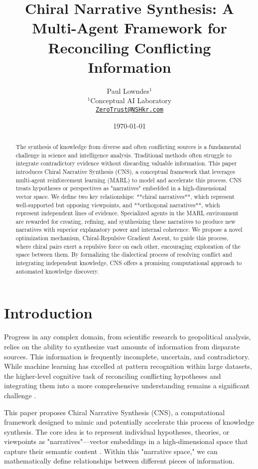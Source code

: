 \documentclass[12pt, a4paper]{article}
\title{\textbf{Chiral Narrative Synthesis: A Multi-Agent Framework for Reconciling Conflicting Information}}
\author{
    Paul Lowndes$^{1}$ \\
    \small $^{1}$Conceptual AI Laboratory \\
    \small \href{mailto:ZeroTrust@NSHkr.com}{\texttt{ZeroTrust@NSHkr.com}}
}
\date{\today}
\begin{document}
\maketitle
\vspace{-2em}

\begin{abstract}
The synthesis of knowledge from diverse and often conflicting sources is a fundamental challenge in science and intelligence analysis. Traditional methods often struggle to integrate contradictory evidence without discarding valuable information. This paper introduces Chiral Narrative Synthesis (CNS), a conceptual framework that leverages multi-agent reinforcement learning (MARL) to model and accelerate this process. CNS treats hypotheses or perspectives as "narratives" embedded in a high-dimensional vector space. We define two key relationships: **chiral narratives**, which represent well-supported but opposing viewpoints, and **orthogonal narratives**, which represent independent lines of evidence. Specialized agents in the MARL environment are rewarded for creating, refining, and synthesizing these narratives to produce new narratives with superior explanatory power and internal coherence. We propose a novel optimization mechanism, Chiral-Repulsive Gradient Ascent, to guide this process, where chiral pairs exert a repulsive force on each other, encouraging exploration of the space between them. By formalizing the dialectical process of resolving conflict and integrating independent knowledge, CNS offers a promising computational approach to automated knowledge discovery.
\end{abstract}

\section{Introduction}

Progress in any complex domain, from scientific research to geopolitical analysis, relies on the ability to synthesize vast amounts of information from disparate sources. This information is frequently incomplete, uncertain, and contradictory. While machine learning has excelled at pattern recognition within large datasets, the higher-level cognitive task of reconciling conflicting hypotheses and integrating them into a more comprehensive understanding remains a significant challenge \cite{Boström2017}.

This paper proposes Chiral Narrative Synthesis (CNS), a computational framework designed to mimic and potentially accelerate this process of knowledge synthesis. The core idea is to represent individual hypotheses, theories, or viewpoints as "narratives"—vector embeddings in a high-dimensional space that capture their semantic content \cite{Devlin2019BERT}. Within this "narrative space," we can mathematically define relationships between different pieces of information.
\end{document}

